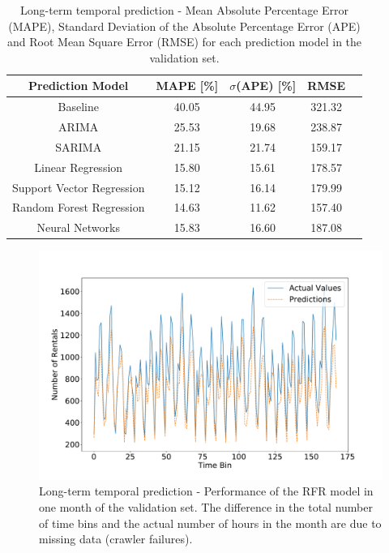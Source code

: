 \begin{table}
 \centering
  \begin{tabular}{ccccl}
  \toprule
    \textbf{Prediction Model} & \textbf{MAPE [\%]} & \textbf{$\sigma$(APE) [\%]} & \textbf{RMSE}\\
    \midrule
    Baseline                   &  40.05 &  44.95 & 321.32 \\
    ARIMA                      &  25.53 &  19.68 & 238.87 \\
    SARIMA                     &  21.15 &  21.74 & 159.17 \\
    Linear Regression          &  15.80 &  15.61 & 178.57 \\
    Support Vector Regression  &  15.12 &  16.14 & 179.99 \\
    Random Forest Regression   &  14.63 &  11.62 & 157.40 \\
    Neural Networks            &  15.83 &  16.60 & 187.08 \\
  \bottomrule
\end{tabular}
\caption{Long-term temporal prediction - Mean Absolute Percentage Error (MAPE), Standard Deviation of the Absolute Percentage Error (APE) and Root Mean Square Error (RMSE) for each prediction model in the validation set.}
\label{tab:8_4_results-stationary-models}
\end{table}

\begin{figure}
    \begin{center}
            \includegraphics[width=0.65\columnwidth]{figures/temporal_analyses/RandomForestStationaryPredictions.pdf}
        \caption{Long-term temporal prediction - Performance of the RFR model in one month of the validation set. The difference in the total number of time bins and the actual number of hours in the month are due to missing data (crawler failures).}
        \label{fig:8_4_random-forests-stationary}
    \end{center}
\end{figure}

